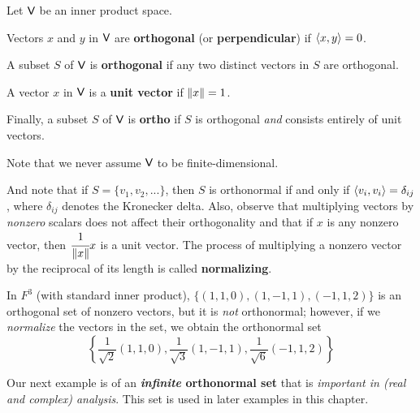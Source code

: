 \begin{definition} \label{def 6.4}
Let \(\textsf{V}\) be an inner product space.

 Vectors \(x\) and \(y\) in \(\textsf{V}\) are \textbf{orthogonal} (or \textbf{perpendicular}) if \(\left< x, y \right> = 0\).

 A subset \(S\) of \(\textsf{V}\) is \textbf{orthogonal} if any two distinct vectors in \(S\) are orthogonal.

 A vector \(x\) in \(\textsf{V}\) is a \textbf{unit vector} if \(\left\lVert x\right\rVert = 1\).

 Finally, a subset \(S\) of \(\textsf{V}\) is \textbf{ortho} if \(S\) is orthogonal \emph{and} consists entirely of unit vectors.

Note that we never assume \(\textsf{V}\) to be finite-dimensional.

And note that if \(S = \{ v_1, v_2, ... \}\), then \(S\) is orthonormal if and only if \(\left< v_i, v_i \right> = \delta_{ij}\), where \(\delta_{ij}\) denotes the Kronecker delta.
Also, observe that multiplying vectors by \emph{nonzero} scalars does not affect their orthogonality and that if \(x\) is any nonzero vector, then \(\cfrac{1}{\left\lVert x\right\rVert} x\) is a unit vector.
The process of multiplying a nonzero vector by the reciprocal of its length is called \textbf{normalizing}.

\end{definition}

\begin{example} \label{example 6.1.8}
In \(F^3\) (with standard inner product), \(\{ (1, 1, 0), (1, -1, 1), (-1, 1, 2) \}\) is an orthogonal set of nonzero vectors, but it is \emph{not} orthonormal;
however, if we \emph{normalize} the vectors in the set, we obtain the orthonormal set
\[
    \left\{ \frac{1}{\sqrt{2}}(1, 1, 0), \frac{1}{\sqrt{3}}(1, -1, 1), \frac{1}{\sqrt{6}}(-1, 1, 2) \right\}
\]
\end{example}

Our next example is of an \textbf{\emph{infinite} orthonormal set} that is \emph{important in (real and complex) analysis}.
This set is used in later examples in this chapter.

